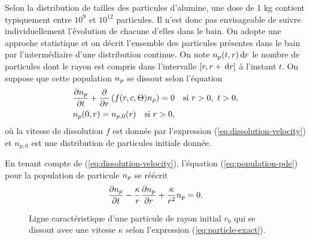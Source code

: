 Selon la distribution de tailles des particules d'alumine, une dose de
\num{1} \si{\kilo\gram} contient typiquement entre $10^9$ et $10^{12}$
particules. Il n'est donc pas envisageable de suivre individuellement
l'évolution de chacune d'elles dans le bain. On adopte une approche
statistique \cite{Hofer2011} et on décrit l'ensemble des particules
présentes dans le bain par l'intermédiaire d'une distribution
continue. On note $n_p(t, r)\,\mathrm dr$ le nombre de particules dont le
rayon est compris dans l'intervalle $[r, r + \,\mathrm dr]$ à l'instant
$t$. On suppose que cette population $n_p$ se dissout selon
l'équation
\begin{align}
&\frac{\partial n_p}{\partial t} + \frac{\partial
}{\partial r}\left( f(r,c,\Theta)n_p \right) = 0\quad \text{si } r > 0,\ t > 0,\label{eq:population-pde}\\
&n_p(0, r) = n_{p,0}(r) \quad \text{si } r > 0,\label{eq:population-ic}
\end{align}
où la vitesse de dissolution $f$ est donnée par l'expression
(\ref{eq:dissolution-velocity}) et $n_{p,0}$ est une distribution de
particules initiale donnée.

En tenant compte de (\ref{eq:dissolution-velocity}), l'équation
(\ref{eq:population-pde}) pour la population de particule
$n_p$ se réécrit
\begin{equation}\label{eq:population-pde-2}
  \frac{\partial n_p}{\partial t} -
  \frac{\kappa}{r}\frac{\partial n_p}{\partial r} +
  \frac{\kappa}{r^2}n_p = 0.
\end{equation}
\newcommand{\rcharacteristic}{R_{(\bar t, \bar r)}}

\begin{figure}
  \begin{center}
    
    \caption{Ligne caractéristique d'une particule de rayon initial
      $r_0$ qui se dissout avec une vitesse $\kappa$ selon
      l'expression (\ref{eq:particle-exact}).}
    \label{fig:characteristics}
  \end{center}
\end{figure}

